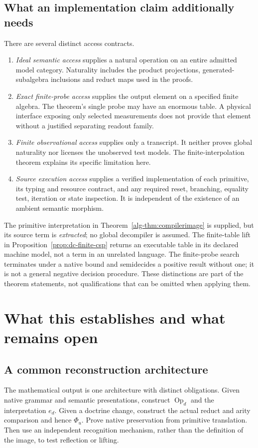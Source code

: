\documentclass[11pt]{article}
\theoremstyle{definition}
\theoremstyle{remark}
\newcommand{\Op}{\operatorname{Op}}
\begin{document}
\subsection{What an implementation claim additionally needs}
There are several distinct access contracts.
\begin{enumerate}
\item \emph{Ideal semantic access} supplies a natural operation on an
entire admitted model category. Naturality includes the product projections,
generated-subalgebra inclusions and reduct maps used in the proofs.
\item \emph{Exact finite-probe access} supplies the output element on a
specified finite algebra. The theorem's single probe may have an enormous
table. A physical interface exposing only selected measurements does not
provide that element without a justified separating readout family.
\item \emph{Finite observational access} supplies only a transcript. It
neither proves global naturality nor licenses the unobserved test models.
The finite-interpolation theorem explains its specific limitation here.
\item \emph{Source execution access} supplies a verified implementation of
each primitive, its typing and resource contract, and any required reset,
branching, equality test, iteration or state inspection. It is independent
of the existence of an ambient semantic morphism.
\end{enumerate}
The primitive interpretation in Theorem~\ref{alg-thm:compilerimage} is
supplied, but its source term is \emph{extracted}; no global decompiler is
assumed. The finite-table lift in Proposition~\ref{prop:dc-finite-csp}
returns an executable table in its declared machine model, not a term in
an unrelated language. The finite-probe search terminates under a native
bound and semidecides a positive result without one; it is not a general
negative decision procedure. These distinctions are part of the theorem
statements, not qualifications that can be omitted when applying them.

\section{What this establishes and what remains open}

\subsection{A common reconstruction architecture}
The mathematical output is one architecture with distinct obligations.
Given native grammar and semantic presentations, construct $\Op_d$ and
the interpretation $e_d$. Given a doctrine change, construct the actual
reduct and arity comparison and hence $\Phi_u$. Prove native preservation
from primitive translation. Then use an independent recognition mechanism,
rather than the definition of the image, to test reflection or lifting.
\end{document}
